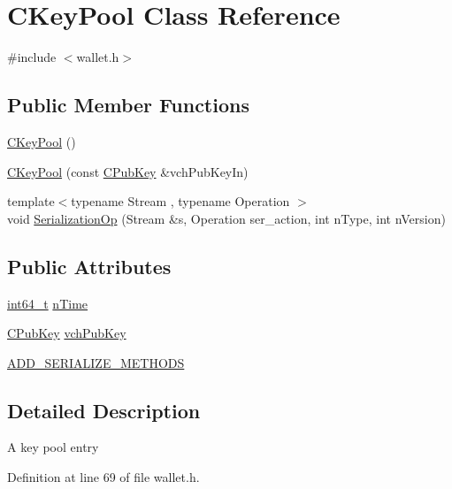 \hypertarget{class_c_key_pool}{}\section{C\+Key\+Pool Class Reference}
\label{class_c_key_pool}


{\ttfamily \#include $<$wallet.\+h$>$}

\subsection*{Public Member Functions}
\begin{DoxyCompactItemize}
\item 
\hyperlink{class_c_key_pool_ab1f33489faff7a7e1edbd61a5a18f604}{C\+Key\+Pool} ()
\item 
\hyperlink{class_c_key_pool_a63e27cd41ea374cc909436b3083b68c4}{C\+Key\+Pool} (const \hyperlink{class_c_pub_key}{C\+Pub\+Key} \&vch\+Pub\+Key\+In)
\item 
{\footnotesize template$<$typename Stream , typename Operation $>$ }\\void \hyperlink{class_c_key_pool_a2589572f0eb90da9237684a16484c03d}{Serialization\+Op} (Stream \&s, Operation ser\+\_\+action, int n\+Type, int n\+Version)
\end{DoxyCompactItemize}
\subsection*{Public Attributes}
\begin{DoxyCompactItemize}
\item 
\hyperlink{stdint_8h_adec1df1b8b51cb32b77e5b86fff46471}{int64\+\_\+t} \hyperlink{class_c_key_pool_aa2f8263f0baf732ad5b4e4b59b482209}{n\+Time}
\item 
\hyperlink{class_c_pub_key}{C\+Pub\+Key} \hyperlink{class_c_key_pool_a937080a4cec1f2b138ebd200557c82b5}{vch\+Pub\+Key}
\item 
\hyperlink{class_c_key_pool_ad4bc93c36031a3e6306c102008be5f51}{A\+D\+D\+\_\+\+S\+E\+R\+I\+A\+L\+I\+Z\+E\+\_\+\+M\+E\+T\+H\+O\+D\+S}
\end{DoxyCompactItemize}


\subsection{Detailed Description}
A key pool entry 

Definition at line 69 of file wallet.\+h.



